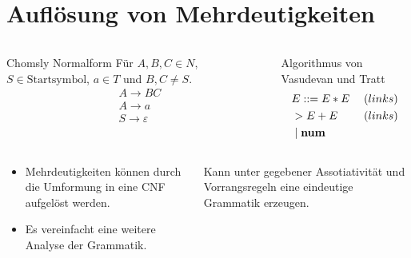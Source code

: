 \documentclass[t]{beamer}
\renewcommand{\Coloneqq}{\mathrel{\mathop{::}}=}
\begin{document}
	\section{Auflösung von Mehrdeutigkeiten}\label{sec:auflsung-von-mehrdeutigkeiten}
	\begin{frame}
		\vspace{-1em}
		\begin{columns}[T]
			\begin{block}{Chomsly Normalform}
				Für $A,B,C \in N$, $S \in \text{Startsymbol}$, $a \in T$ und $B,C \neq S$. \\
				\begin{align*}
					& A \rightarrow BC \\
					& A \rightarrow a \\
					& S \rightarrow \varepsilon
				\end{align*}
			\end{block}
			\begin{block}{Algorithmus von Vasudevan und Tratt}
				\begin{align*}
					& E \Coloneqq E * E \phantom{|} & (links) \\
					& > E + E & (links) \\
					& \phantom{|} | \phantom{|} \bold{num}
				\end{align*}
			\end{block}
		\end{columns}
		\vspace{1em}
		\begin{columns}[T]
			\begin{exampleblock}{}
				\begin{itemize}
					\item Mehrdeutigkeiten können durch die Umformung in eine CNF aufgelöst werden.\cite{kemp1974}
					\item Es vereinfacht eine weitere Analyse der Grammatik.
				\end{itemize}
			\end{exampleblock}
			\begin{exampleblock}{}
				Kann unter gegebener Assotiativität und Vorrangsregeln eine eindeutige Grammatik erzeugen. \cite{springer2013}
			\end{exampleblock}
		\end{columns}
	\end{frame}
\end{document}
